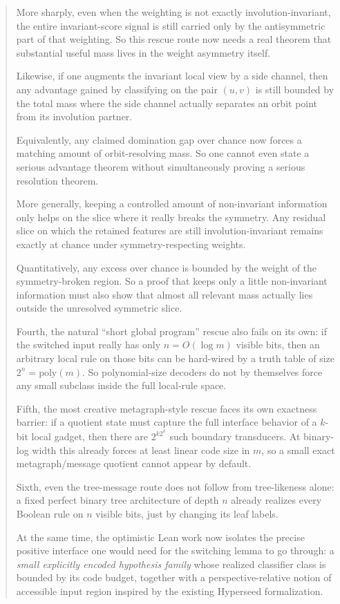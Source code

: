 \documentclass[11pt]{article}
\theoremstyle{remark}
\begin{document}
\begin{abstract}
More sharply, even when the weighting is not exactly involution-invariant, the entire invariant-score
signal is still carried only by the antisymmetric part of that weighting.  So this rescue route now
needs a real theorem that substantial useful mass lives in the weight asymmetry itself.

Likewise, if one augments the invariant local view by a side channel, then any advantage gained by
classifying on the pair \((u,v)\) is still bounded by the total mass where the side channel actually
separates an orbit point from its involution partner.

Equivalently, any claimed domination gap over chance now forces a matching amount of orbit-resolving
mass.  So one cannot even state a serious advantage theorem without simultaneously proving a serious
resolution theorem.

More generally, keeping a controlled amount of non-invariant information only helps on the slice
where it really breaks the symmetry.  Any residual slice on which the retained features are still
involution-invariant remains exactly at chance under symmetry-respecting weights.

Quantitatively, any excess over chance is bounded by the weight of the
symmetry-broken region.  So a proof that keeps only a little non-invariant information must also
show that almost all relevant mass actually lies outside the unresolved symmetric slice.

Fourth, the natural ``short global program'' rescue also fails on its own: if the switched input
really has only \(n = O(\log m)\) visible bits, then an arbitrary local rule on those bits can be
hard-wired by a truth table of size \(2^n = \mathrm{poly}(m)\).  So polynomial-size decoders do
not by themselves force any small subclass inside the full local-rule space.

Fifth, the most creative metagraph-style rescue faces its own exactness barrier: if a quotient
state must capture the full interface behavior of a \(k\)-bit local gadget, then there are
\(2^{k2^k}\) such boundary transducers.  At binary-log width this already forces at least linear
code size in \(m\), so a small exact metagraph/message quotient cannot appear by default.

Sixth, even the tree-message route does not follow from tree-likeness alone: a fixed perfect
binary tree architecture of depth \(n\) already realizes every Boolean rule on \(n\) visible bits,
just by changing its leaf labels.

At the same time, the optimistic Lean work now isolates the precise positive interface one
would need for the switching lemma to go through: a \emph{small explicitly encoded
hypothesis family} whose realized classifier class is bounded by its code budget, together
with a perspective-relative notion of accessible input region inspired by the existing
Hyperseed formalization.


\end{abstract}
\end{document}
